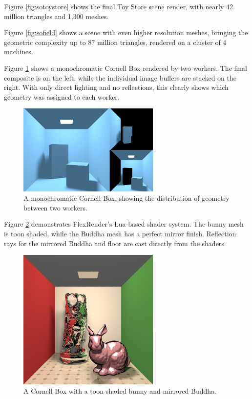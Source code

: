 \documentclass[a4paper,twoside]{article}
\begin{document}
Figure \ref{fig:sotoystore} shows the final Toy Store scene render, with nearly
42 million triangles and 1,300 meshes.

Figure \ref{fig:sofield} shows a scene with even higher resolution meshes,
bringing the geometric complexity up to 87 million triangles, rendered on a
cluster of 4 machines.

Figure \ref{fig:sodist} shows a monochromatic Cornell Box rendered by two
workers. The final composite is on the left, while the individual image buffers
are stacked on the right. With only direct lighting and no reflections, this
clearly shows which geometry was assigned to each worker.

\begin{figure}[h!]
    \centering
    \includegraphics[width=70mm]{showoff/distribution.png}
    \caption{A monochromatic Cornell Box, showing the distribution of geometry between two workers.}
    \label{fig:sodist}
\end{figure}

Figure \ref{fig:socornell} demonstrates FlexRender's Lua-based shader system.
The bunny mesh is toon shaded, while the Buddha mesh has a perfect mirror
finish. Reflection rays for the mirrored Buddha and floor are cast directly
from the shaders.

\begin{figure}[h!]
    \centering
    \includegraphics[width=70mm]{showoff/cornell-models.png}
    \caption{A Cornell Box with a toon shaded bunny and mirrored Buddha.}
    \label{fig:socornell}
\end{figure}
\end{document}
